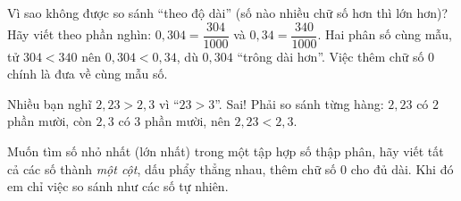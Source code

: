 \documentclass[11pt]{article}
\begin{document}
\begin{proofbox}
Vì sao không được so sánh ``theo độ dài'' (số nào nhiều chữ số hơn thì lớn hơn)? Hãy viết theo phần nghìn:
$0{,}304 = \dfrac{304}{1000}$ và $0{,}34 = \dfrac{340}{1000}$. Hai phân số cùng mẫu, tử $304 < 340$ nên
$0{,}304 < 0{,}34$, dù $0{,}304$ ``trông dài hơn''. Việc thêm chữ số $0$ chính là đưa về cùng mẫu số.
\end{proofbox}
\begin{warnbox}
Nhiều bạn nghĩ $2{,}23 > 2{,}3$ vì ``$23 > 3$''. Sai! Phải so sánh từng hàng: $2{,}23$ có $2$ phần mười,
còn $2{,}3$ có $3$ phần mười, nên $2{,}23 < 2{,}3$.
\end{warnbox}
\begin{tipbox}
Muốn tìm số nhỏ nhất (lớn nhất) trong một tập hợp số thập phân, hãy viết tất cả các số thành \emph{một cột}, dấu phẩy
thẳng nhau, thêm chữ số $0$ cho đủ dài. Khi đó em chỉ việc so sánh như các số tự nhiên.
\end{tipbox}
\end{document}
